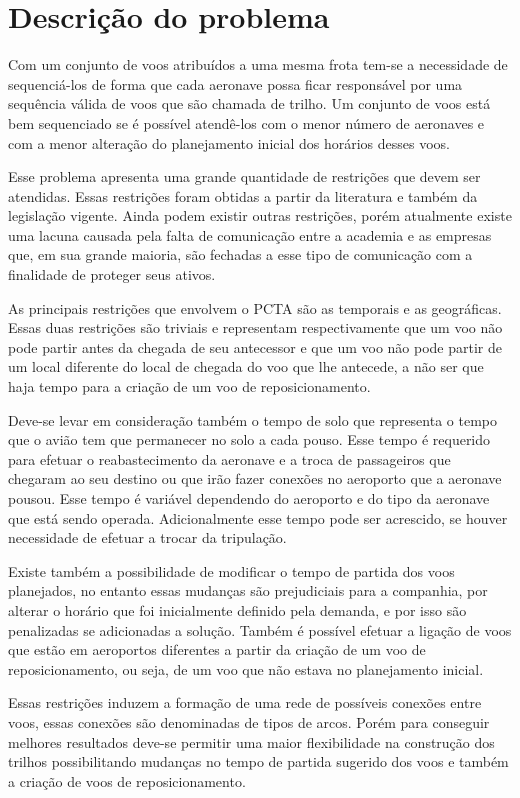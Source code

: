 \chapter{Descrição do problema}\label{cap:descprob}

Com um conjunto de voos atribuídos a uma mesma frota tem-se a necessidade de
sequenciá-los de forma que cada aeronave possa ficar responsável por uma
sequência válida de voos que são chamada de trilho. Um conjunto de voos está
bem sequenciado se é possível atendê-los com o menor número de aeronaves e com a
menor alteração do planejamento inicial dos horários desses voos.
 
Esse problema apresenta uma grande quantidade de restrições que devem ser
atendidas. Essas restrições foram obtidas a partir da literatura e também da
legislação vigente. Ainda podem existir outras restrições, porém
atualmente existe uma lacuna causada pela falta de comunicação entre a
academia e as empresas que, em sua grande maioria, são fechadas a esse tipo de
comunicação com a finalidade de proteger seus ativos.

As principais restrições que envolvem o PCTA são as temporais e as geográficas.
Essas duas restrições são triviais e representam respectivamente que um voo não
pode partir antes da chegada de seu antecessor e que um voo não pode partir de
um local diferente do local de chegada do voo que lhe antecede, a não ser que
haja tempo para a criação de um voo de reposicionamento. 

Deve-se levar em consideração também o
tempo de solo que representa o tempo que o avião tem que permanecer no solo a
cada pouso. Esse tempo é requerido para efetuar o reabastecimento da aeronave e a
troca de passageiros que chegaram ao seu destino ou que irão fazer conexões no
aeroporto que a aeronave pousou. Esse tempo é variável dependendo do
aeroporto e do tipo da aeronave que está sendo operada. Adicionalmente esse
tempo pode ser acrescido, se houver necessidade de efetuar a trocar da
tripulação.

Existe também a possibilidade de modificar o tempo de partida dos voos
planejados, no entanto essas mudanças são prejudiciais para a companhia, por
alterar o horário que foi inicialmente definido pela demanda, e por isso são
penalizadas se adicionadas a solução. Também é possível efetuar a ligação de
voos que estão em aeroportos diferentes a partir da criação de um voo de
reposicionamento, ou seja, de um voo que não estava no planejamento
inicial.

Essas restrições induzem a formação de uma rede de possíveis conexões entre
voos, essas conexões são denominadas de tipos de arcos. Porém para conseguir
melhores resultados deve-se permitir uma maior flexibilidade na construção dos
trilhos possibilitando mudanças no tempo de partida sugerido dos voos e
também a criação de voos de reposicionamento.

